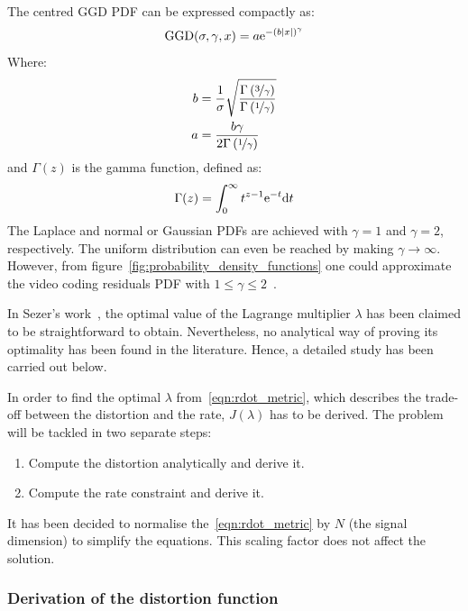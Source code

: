 \documentclass[11pt,a4paper,openright,twoside]{book}
\numberwithin{equation}{section} %
\numberwithin{figure}{section} %
\numberwithin{table}{section} %
\begin{document}
The centred \ac{GGD} \ac{PDF} can be expressed compactly as:
\begin{equation}
	\text{GGD}(\sigma,\gamma,x)=
	a\text{e}^{-{\left(b\vert x \vert\right)}^\gamma}
	\label{eqn:ggd}
\end{equation}
Where:
\begin{align}
	b &= \frac{1}{\sigma}\sqrt{
	\frac{\Gamma\left(\nicefrac{3}{\gamma}\right)}
	{\Gamma \left(\nicefrac{1}{\gamma}\right)}} \\
	a &= \frac{b\gamma}{2\Gamma \left(\nicefrac{1}{\gamma}\right)}
\end{align}
and $\Gamma(z)$ is the gamma function, defined as:
\begin{equation}
	\Gamma(z) = \int_0^\infty t^{z-1}\text{e}^{-t}\text{d} t
\end{equation}
The Laplace and normal or Gaussian \acp{PDF} are achieved with
$\gamma=1$ and $\gamma=2$, respectively.
The uniform distribution can even be reached by making $\gamma\to\infty$.
However, from figure~\ref{fig:probability_density_functions} one could
approximate the video coding residuals \ac{PDF} with
$1\le\gamma\le2$~\cite{li-08-laplacian-modeling-dct-coefficients}.

In Sezer's work~\cite{sezer-11-phd,sezer-08-sparse-orthonormal-transforms},
the optimal value of the Lagrange multiplier $\lambda$ has been claimed
to be straightforward to obtain.
Nevertheless, no analytical way of proving its optimality has been found in
the literature.
Hence, a detailed study has been carried out below.

In order to find the optimal $\lambda$ from~\eqref{eqn:rdot_metric},
which describes the trade-off between the distortion and the rate,
$J(\lambda)$ has to be derived.
The problem will be tackled in two separate steps:
\begin{enumerate}
	\item Compute the distortion analytically and derive it.
	\item Compute the rate constraint and derive it.
\end{enumerate}
It has been decided to normalise the~\eqref{eqn:rdot_metric} by $N$ (the
signal dimension) to simplify the equations.
This scaling factor does not affect the solution.

\subsubsection{Derivation of the distortion function}
\label{ssub:derivation_of_the_distortion_function}
\end{document}
